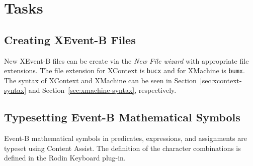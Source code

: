 \section{Tasks}
\label{sec:tasks}

\subsection{Creating XEvent-B Files}
\label{sec:creating-xevent-b}

New XEvent-B files can be create via the \emph{New File wizard} with appropriate file extensions. The file extension for XContext is \texttt{bucx} and for XMachine is \texttt{bumx}.  The syntax of XContext and XMachine can be seen in Section~\ref{sec:xcontext-syntax} and Section~\ref{sec:xmachine-syntax}, respectively.

\subsection{Typesetting Event-B Mathematical Symbols}
\label{sec:typesetting-event-b}
Event-B mathematical symbols in predicates, expressions, and assignments are typeset using Content Assist.  The definition of the character combinations is defined in the Rodin Keyboard plug-in.


